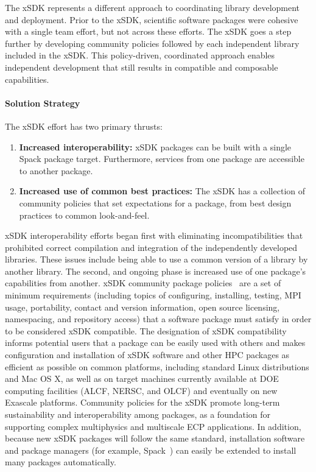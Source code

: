 The xSDK represents a different approach to coordinating library development and deployment.  Prior to the xSDK, scientific software packages were cohesive with a single team effort, but not across these efforts. The xSDK goes a step further by developing community policies followed by each independent library included in the xSDK.  This policy-driven, coordinated approach enables independent development that still results in compatible and composable capabilities.

\paragraph{Solution Strategy}

The xSDK effort has two primary thrusts:
\begin{enumerate}
	\item \textbf{Increased interoperability:} xSDK packages can be built with a single Spack package target.  Furthermore, services from one package are accessible to another package.
	\item \textbf{Increased use of common best practices:}  The xSDK has a collection of community policies that set expectations for a package, from best design practices to common look-and-feel.
\end{enumerate}

xSDK interoperability efforts began first with eliminating incompatibilities that prohibited correct compilation and integration of the independently developed libraries.  These issues include being able to use a common version of a library by another library.  The second, and ongoing phase is increased use of one package's capabilities from another. xSDK community package policies~\cite{xsdk-policies:homepage,xsdk-policies:github} are a set of minimum requirements (including topics of configuring, installing, testing, MPI usage, portability, contact and version information, open source licensing, namespacing, and repository access) that a software package must satisfy in order to be considered xSDK compatible. The designation of xSDK compatibility informs potential users that a package can be easily used with others and makes configuration and installation of xSDK software and other HPC packages as efficient as possible on common platforms, including standard Linux distributions and Mac OS X, as well as on target machines currently available at DOE computing facilities (ALCF, NERSC, and OLCF) and eventually on new Exascale platforms.
Community policies for the xSDK promote long-term sustainability and interoperability among packages, as a foundation for supporting complex multiphysics and multiscale ECP applications. In addition, because new xSDK packages will follow the same standard, installation software and package managers (for example, Spack~\cite{gamblin+:sc15}) can easily be extended to install many packages automatically.

